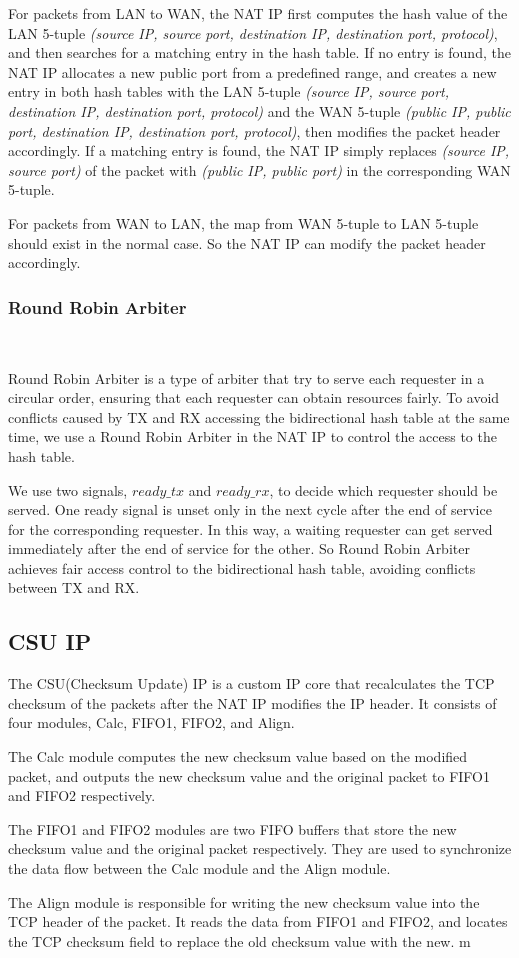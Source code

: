     For packets from LAN to WAN, the NAT IP first computes the hash value of the LAN 5-tuple \emph{(source IP, source port, destination IP, destination port, protocol)}, and then searches for a matching entry in the hash table. If no entry is found, the NAT IP allocates a new public port from a predefined range, and creates a new entry in both hash tables with the LAN 5-tuple \emph{(source IP, source port, destination IP, destination port, protocol)} and the WAN 5-tuple \emph{(public IP, public port, destination IP, destination port, protocol)}, then modifies the packet header accordingly. If a matching entry is found, the NAT IP simply replaces \emph{(source IP,  source port)} of the packet with \emph{(public IP, public port)} in the corresponding WAN 5-tuple.

    For packets from WAN to LAN, the map from WAN 5-tuple to LAN 5-tuple should exist in the normal case. So the NAT IP can modify the packet header accordingly.

    \subsubsection{Round Robin Arbiter}\

    Round Robin Arbiter is a type of arbiter that try to serve each requester in a circular order, ensuring that each requester can obtain resources fairly. To avoid conflicts caused by TX and RX accessing the bidirectional hash table at the same time, we use a Round Robin Arbiter in the NAT IP to control the access to the hash table. 

    We use two signals, $ready\_tx$ and $ready\_rx$, to decide which requester should be served. One ready signal  is unset only in the next cycle after the end of service for the corresponding requester. In this way, a waiting requester can get served immediately after the end of service for the other. So Round Robin Arbiter achieves fair access control to the bidirectional hash table, avoiding conflicts between TX and RX.
    
\subsection{CSU IP}
    The CSU(Checksum Update) IP is a custom IP core that recalculates the TCP checksum of the packets after the NAT IP modifies the IP header. It consists of four modules, Calc, FIFO1, FIFO2, and Align. 

    The Calc module computes the new checksum value based on the modified packet, and outputs the new checksum value and the original packet to FIFO1 and FIFO2 respectively.

    The FIFO1 and FIFO2 modules are two FIFO buffers that store the new checksum value and the original packet respectively. They are used to synchronize the data flow between the Calc module and the Align module. 

    The Align module is responsible for writing the new checksum value into the TCP header of the packet. It reads the data from FIFO1 and FIFO2, and locates the TCP checksum field to replace the old checksum value with the new.
m